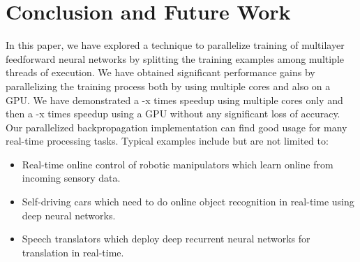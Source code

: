 \section{Conclusion and Future Work}
\label{Future}

In this paper, we have explored a technique to parallelize training of multilayer feedforward neural networks by splitting the training examples among multiple threads of execution.
We have obtained significant performance gains by parallelizing the training process both by using multiple cores and also on a GPU. We have demonstrated a -x times speedup using multiple cores only and then a -x times speedup using a GPU without any significant loss of accuracy.
Our parallelized backpropagation implementation can find good usage for many real-time processing tasks. Typical examples include but are not limited to:
\begin{itemize}
\item Real-time online control of robotic manipulators which learn online from incoming sensory data.
\item Self-driving cars which need to do online object recognition in real-time using deep neural networks.
\item Speech translators which deploy deep recurrent neural networks for translation in real-time.
\end{itemize} 
